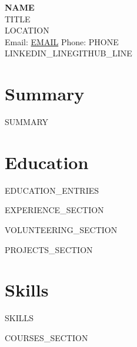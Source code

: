 \documentclass[10pt,a4paper]{article}
\begin{document}
\begin{center}
{\LARGE \textbf{{{NAME}}}}\\
{{TITLE}}\\
{{LOCATION}}\\
Email: \href{mailto:{{EMAIL}}}{{{EMAIL}}}
\hspace{0.8em}\textbar\hspace{0.8em}
Phone: {{PHONE}}\\
{{LINKEDIN_LINE}}{{GITHUB_LINE}}
\end{center}

\vspace{-5pt}

\section{Summary}
{{SUMMARY}}

\section{Education}
{{EDUCATION_ENTRIES}}

{{EXPERIENCE_SECTION}}

{{VOLUNTEERING_SECTION}}

{{PROJECTS_SECTION}}

\section{Skills}
{{SKILLS}}

{{COURSES_SECTION}}
\end{document}

